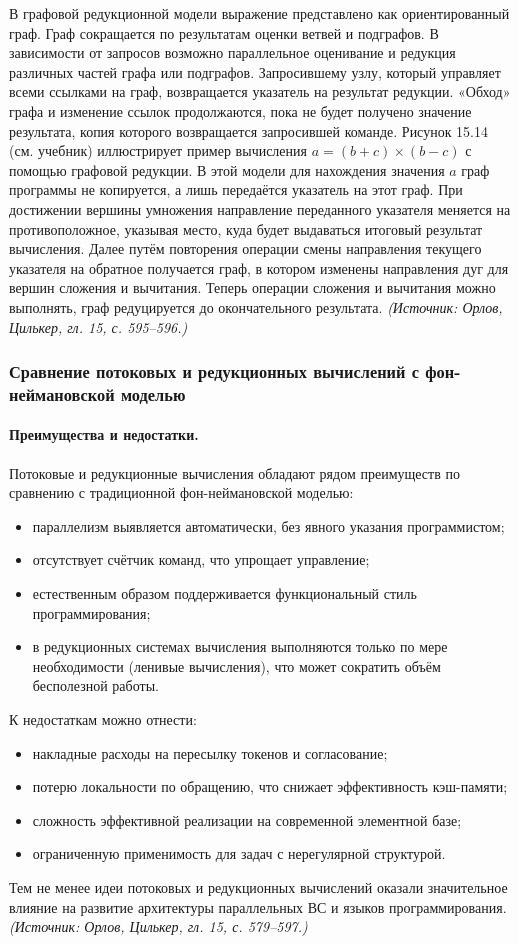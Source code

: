 \documentclass[a4paper,12pt]{article}
\begin{document}
В графовой редукционной модели выражение представлено как ориентированный граф. Граф сокращается по результатам оценки ветвей и подграфов. В зависимости от запросов возможно параллельное оценивание и редукция различных частей графа или подграфов. Запросившему узлу, который управляет всеми ссылками на граф, возвращается указатель на результат редукции. «Обход» графа и изменение ссылок продолжаются, пока не будет получено значение результата, копия которого возвращается запросившей команде. Рисунок 15.14 (см. учебник) иллюстрирует пример вычисления \(a=(b+c)\times(b-c)\) с помощью графовой редукции. В этой модели для нахождения значения \(a\) граф программы не копируется, а лишь передаётся указатель на этот граф. При достижении вершины умножения направление переданного указателя меняется на противоположное, указывая место, куда будет выдаваться итоговый результат вычисления. Далее путём повторения операции смены направления текущего указателя на обратное получается граф, в котором изменены направления дуг для вершин сложения и вычитания. Теперь операции сложения и вычитания можно выполнять, граф редуцируется до окончательного результата.
\textit{(Источник: Орлов, Цилькер, гл. 15, с. 595--596.)}

\subsubsection{Сравнение потоковых и редукционных вычислений с фон-неймановской моделью}

\paragraph{Преимущества и недостатки.}
Потоковые и редукционные вычисления обладают рядом преимуществ по сравнению с традиционной фон-неймановской моделью:
\begin{itemize}
\item параллелизм выявляется автоматически, без явного указания программистом;
\item отсутствует счётчик команд, что упрощает управление;
\item естественным образом поддерживается функциональный стиль программирования;
\item в редукционных системах вычисления выполняются только по мере необходимости (ленивые вычисления), что может сократить объём бесполезной работы.
\end{itemize}
К недостаткам можно отнести:
\begin{itemize}
\item накладные расходы на пересылку токенов и согласование;
\item потерю локальности по обращению, что снижает эффективность кэш-памяти;
\item сложность эффективной реализации на современной элементной базе;
\item ограниченную применимость для задач с нерегулярной структурой.
\end{itemize}
Тем не менее идеи потоковых и редукционных вычислений оказали значительное влияние на развитие архитектуры параллельных ВС и языков программирования.
\textit{(Источник: Орлов, Цилькер, гл. 15, с. 579--597.)}
\end{document}
